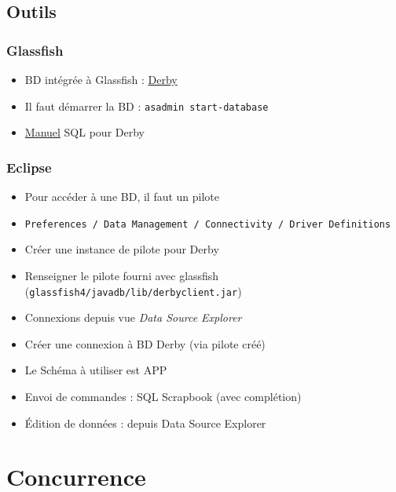 \documentclass[english, french]{beamer}
\begin{document}
\subsection{Outils}
\begin{frame}
	\frametitle{Glassfish}
	\begin{itemize}
		\item BD intégrée à Glassfish : \href{https://db.apache.org/derby/}{Derby}
		\item Il faut démarrer la BD : \texttt{asadmin start-database}
		\item \href{https://db.apache.org/derby/docs/10.10/ref/index.html}{Manuel} SQL pour Derby
	\end{itemize}
\end{frame}

\begin{frame}
	\frametitle{Eclipse}
	\begin{itemize}
		\item Pour accéder à une BD, il faut un pilote
		\item \texttt{Preferences / Data Management / Connectivity / Driver Definitions}
		\item Créer une instance de pilote pour Derby
		\item Renseigner le pilote fourni avec glassfish (\texttt{glassfish4/javadb/lib/derbyclient.jar})
		\item Connexions depuis vue \emph{Data Source Explorer}
		\item Créer une connexion à BD Derby (via pilote créé)
		\item Le Schéma à utiliser est \og{}APP\fg{}
		\item Envoi de commandes : SQL Scrapbook (avec complétion)
		\item Édition de données : depuis Data Source Explorer
	\end{itemize}
\end{frame}

\newlength{\JEEIsolVert}
\newlength{\JEEIsolBefTr}
\newlength{\JEEIsolOuter}
\setlength{\JEEIsolVert}{3mm}
\setlength{\JEEIsolBefTr}{1.2cm}
\setlength{\JEEIsolOuter}{3mm}

\section{Concurrence}
\end{document}
